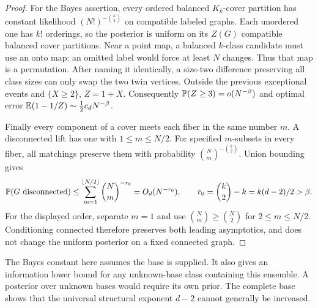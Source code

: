 \begin{proof}
For the Bayes assertion, every ordered balanced $K_k$-cover partition
has constant likelihood $(N!)^{-\binom k2}$ on compatible labeled
graphs. Each unordered one has $k!$ orderings, so the posterior is
uniform on its $Z(G)$ compatible balanced cover partitions.
Near a point map, a balanced $k$-class candidate must use an onto
map: an omitted label would force at least $N$ changes. Thus that map
is a permutation. After naming it identically, a size-two difference
preserving all class sizes can only swap the two twin vertices.
Outside the previous exceptional events and $\{X\ge2\}$, $Z=1+X$.
Consequently $\mathbb P(Z\ge3)=o(N^{-\beta})$ and optimal error
$\mathbb E(1-1/Z)\sim \frac12c_dN^{-\beta}$.

Finally every component of a cover meets each fiber in the same
number $m$. A disconnected lift has one with $1\le m\le N/2$.
For specified $m$-subsets in every fiber, all matchings preserve them
with probability $\binom Nm^{-\binom k2}$. Union bounding gives
\[
 \mathbb P(G\text{ disconnected})
 \le\sum_{m=1}^{\lfloor N/2\rfloor}\binom Nm^{-r_0}
 =O_d(N^{-r_0}),\qquad r_0=\binom k2-k=k(d-2)/2>\beta.
\]
For the displayed order, separate $m=1$ and use
$\binom Nm\ge\binom N2$ for $2\le m\le N/2$.
Conditioning connected therefore preserves both leading asymptotics,
and does not change the uniform posterior on a fixed connected graph.
\end{proof}

The Bayes constant here assumes the base is supplied. It also gives an
information lower bound for any unknown-base class containing this
ensemble. A posterior over unknown bases would require its own prior.
The complete base shows that the universal structural exponent $d-2$
cannot generally be increased.

